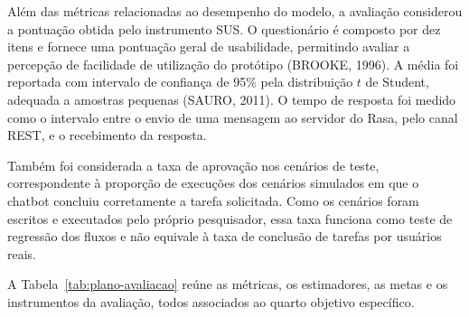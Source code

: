 \documentclass[12pt,a4paper]{extarticle}
\begin{document}
Além das métricas relacionadas ao desempenho do modelo, a avaliação considerou a pontuação obtida pelo instrumento SUS. O questionário é composto por dez itens e fornece uma pontuação geral de usabilidade, permitindo avaliar a percepção de facilidade de utilização do protótipo (BROOKE, 1996). A média foi reportada com intervalo de confiança de 95\% pela distribuição $t$ de Student, adequada a amostras pequenas (SAURO, 2011). O tempo de resposta foi medido como o intervalo entre o envio de uma mensagem ao servidor do Rasa, pelo canal REST, e o recebimento da resposta.

Também foi considerada a taxa de aprovação nos cenários de teste, correspondente à proporção de execuções dos cenários simulados em que o chatbot concluiu corretamente a tarefa solicitada. Como os cenários foram escritos e executados pelo próprio pesquisador, essa taxa funciona como teste de regressão dos fluxos e não equivale à taxa de conclusão de tarefas por usuários reais.

A Tabela~\ref{tab:plano-avaliacao} reúne as métricas, os estimadores, as metas e os instrumentos da avaliação, todos associados ao quarto objetivo específico.
\end{document}
